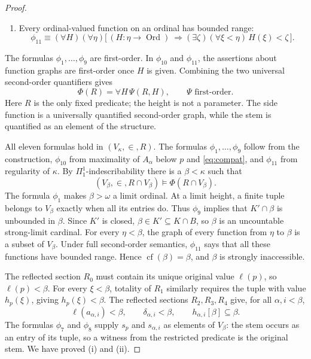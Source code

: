 \documentclass[10pt,a4paper]{amsart}
\theoremstyle{definition}
\theoremstyle{remark}
\DeclareMathOperator{\Ord}{Ord}
\begin{document}
\begin{proof}
\begin{enumerate}[label=\textup{(\alph*)}]
\[\begin{split}
                         h_{\alpha,i}(\xi)\leq s(\xi)]\bigr)\,\bigr].
\end{split}
\]
\item Every ordinal-valued function on an ordinal has
bounded range:
\[
 \phi_{11}\equiv (\forall H)(\forall\eta)\bigl[\,
   (H:\eta\to\Ord)\ \Longrightarrow
   (\exists\zeta)(\forall\xi<\eta)\,H(\xi)<\zeta
   \,\bigr].
\]
\end{enumerate}
The formulas \(\phi_1,\ldots,\phi_9\) are first-order.
In \(\phi_{10}\) and \(\phi_{11}\), the assertions
about function graphs are first-order once \(H\) is given. Combining
the two universal second-order quantifiers gives
\begin{equation}\label{eq:reflection-sentence}
 \Phi(R)=\forall H\,\Psi(R,H),
 \qquad\Psi\text{ first-order}.
\end{equation}
Here \(R\) is the only fixed predicate; the height is not a
parameter. The side function is a universally quantified second-order
graph, while the stem is quantified as an element of the structure.

All eleven formulas hold in \((V_\kappa,\in,R)\).
The formulas \(\phi_1,\ldots,\phi_9\)
follow from the construction, \(\phi_{10}\) from maximality of \(A_\alpha\)
below \(p\) and \eqref{eq:compat}, and \(\phi_{11}\) from regularity of
\(\kappa\). By \(\Pi^1_1\)-indescribability there is a
\(\beta<\kappa\) such that
\[
 (V_\beta,\in,R\cap V_\beta)\models\Phi(R\cap V_\beta).
\]
The formula \(\phi_1\) makes \(\beta>\omega\) a limit ordinal. At a limit
height, a finite tuple belongs to \(V_\beta\) exactly when all
its entries do. Thus \(\phi_9\) implies that \(K'\cap\beta\)
is unbounded in \(\beta\). Since \(K'\) is closed,
\(\beta\in K'\subseteq K\cap B\), so \(\beta\) is an
uncountable strong-limit cardinal. For every \(\eta<\beta\),
the graph of every function from \(\eta\) to \(\beta\) is a
subset of \(V_\beta\). Under full second-order semantics,
\(\phi_{11}\) says that all these functions have bounded range.
Hence \(\operatorname{cf}(\beta)=\beta\), and \(\beta\) is
strongly inaccessible.

The reflected section \(R_0\) must contain its unique original
value \(\ell(p)\), so \(\ell(p)<\beta\). For every
\(\xi<\beta\), totality of \(R_1\) similarly requires the
tuple with value \(h_p(\xi)\), giving \(h_p(\xi)<\beta\).
The reflected sections \(R_2,R_3,R_4\) give, for all
\(\alpha,i<\beta\),
\[
 \ell(a_{\alpha,i})<\beta,\qquad
 \delta_{\alpha,i}<\beta,\qquad
 h_{\alpha,i}[\beta]\subseteq\beta.
\]
The formulas \(\phi_7\) and \(\phi_8\) supply
\(s_p\) and \(s_{\alpha,i}\) as elements
of \(V_\beta\): the stem occurs as an entry of its tuple, so a
witness from the restricted predicate is the original stem. We have
proved (i) and (ii).


\end{proof}
\end{document}
